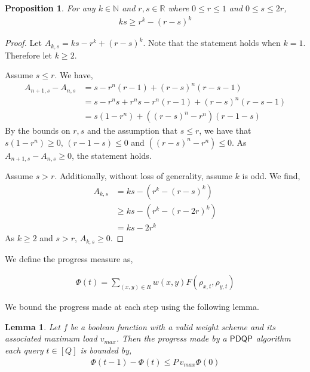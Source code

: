 \documentclass[10pt,a4paper]{article}
\newcommand{\queryamount}[0]{\ensuremath{Q}\xspace}
\newcommand{\abilityamount}[0]{\ensuremath{P}\xspace} %
\newcommand{\compclass}[2][]{\ensuremath{\mathsf{#2}^{#1}}\xspace}
\newcommand{\pdqpname}[0]{\compclass{PDQP}}
\newtheorem{lemma}[theorem]{Lemma}
\newtheorem{proposition}[theorem]{Proposition}
\begin{document}
\begin{proposition}\label{proposition_polynomial_bound}
        For any $k\in \mathbb{N}$ and $r,s\in \mathbb{R}$ where $ 0\leq r \leq 1 $ and $0\leq s \leq 2r$,
        \begin{align*}
            ks \geq r^k - (r-s)^k
        \end{align*}
\end{proposition}
\begin{proof}
    Let $A_{k,s} = ks - r^k + (r-s)^k$. Note that the statement holds when $k=1$. Therefore let $k\geq 2$.

    Assume $s\leq r$. We have,
    \begin{align*}
        A_{n+1,s} - A_{n,s} &= s - r^n(r-1) + (r-s)^n(r-s-1)\\
        &= s -r^ns +r^ns -r^n(r-1) + (r-s)^n(r-s-1)\\ 
        &= s(1-r^n)+((r-s)^n -r^n)(r-1-s)
    \end{align*}
    By the bounds on $r,s$ and the assumption that $s\leq r$, we have that $s(1-r^n)\geq 0$, $(r-1-s)\leq 0$ and $((r-s)^n -r^n)\leq 0$. As $A_{n+1,s} - A_{n,s} \geq 0$, the statement holds. 

    Assume $s>r$. Additionally, without loss of generality, assume $k$ is odd. We find,
    \begin{align*}
        A_{k,s} &= ks-(r^k-(r-s)^k)\\
            &\geq ks - (r^k-(r-2r)^k)\\
            &= ks - 2r^k
    \end{align*}
    As $k\geq 2$ and $s>r$, $A_{k,s}\geq 0$.
\end{proof}

We define the progress measure as,

\begin{align*}
    \Phi(t) = \sum_{(x,y)\in R} w(x,y) F(\rho_{x,t}, \rho_{y,t})
\end{align*}

We bound the progress made at each step using the following lemma.

\begin{lemma}\label{lemma_progress_measure_partial_measurement}
    Let $f$ be a boolean function with a valid weight scheme and its associated maximum load $v_{max}$. Then the progress made by a \pdqpname algorithm each query $t\in [\queryamount]$ is bounded by,
    \begin{align*}
        \Phi(t-1)-\Phi(t)\leq \abilityamount\, v_{max} \Phi (0)
    \end{align*}
\end{lemma}
\end{document}
